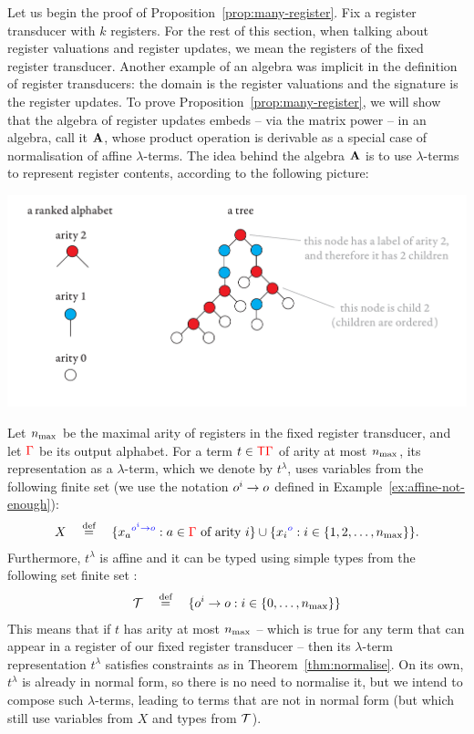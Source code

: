 Let us begin the proof of Proposition~\ref{prop:many-register}.
Fix a register transducer with $k$ registers. For the rest of this section, when talking about register valuations and register updates, we mean the registers of the fixed register transducer.
Another example of an algebra was implicit in the definition of register transducers: the domain is the register valuations and the signature is the  register updates. To prove  Proposition~\ref{prop:many-register}, we will show that the algebra of register updates embeds -- via the matrix power -- in an algebra, call it ${\color{black}\mathbf A}$, whose product operation is derivable as a special case of normalisation of affine $\lambda$-terms. 
 The idea behind the algebra  ${\color{black}\mathbf A}$ is to use  $\lambda$-terms to represent register contents, according to the following picture:
 \begin{center}
 \includegraphics[scale=.3, page=59]{pics.pdf}
 \end{center}
    Let  $n_{\mathrm{max}}$  be the maximal arity of registers in the fixed register transducer, and let  ${\color{red}{\Gamma}}$ be its  output alphabet. For a term $t \in {\color{red}{\mathsf T}} {\color{red}{\Gamma}}$ of arity at most $n_{\mathrm{max}}$, its representation as a  $\lambda$-term, which we denote by $t^\lambda$,  uses variables from the following finite set (we use the notation $o^i \to o$ defined in Example~\ref{ex:affine-not-enough}):
\begin{align*}
X  \quad \stackrel{\text{def}}= \quad \{{x_a}^{\color{blue}{o^i \to o}} : a \in {\color{red}{\Gamma}} \text{ of arity $i$}\} \cup \{{x_i}^{\color{blue}{o}} : i \in \{1,2,\ldots,n_{\mathrm{max}} \}\}.
\end{align*}
Furthermore, $t^\lambda$ is affine and it can be typed using simple types  from  the following set finite set :
\begin{align*}
    {\mathcal T} \quad \stackrel{\text{def}}= \quad \{o^i \to o : i \in \{0,\ldots,n_{\mathrm{max}}\}\}
\end{align*}
This means that if $t$ has arity at most $n_{\mathrm{max}}$ -- which is true for any term that can appear in a register of our fixed register transducer -- then its $\lambda$-term representation $t^\lambda$ satisfies constraints as in Theorem~\ref{thm:normalise}.  On its own, $t^\lambda$ is already in normal form, so there is no need to normalise it, but we intend to compose  such $\lambda$-terms, leading to terms that are not in normal form (but which still use variables from $X$ and types from ${\mathcal T}$). 
